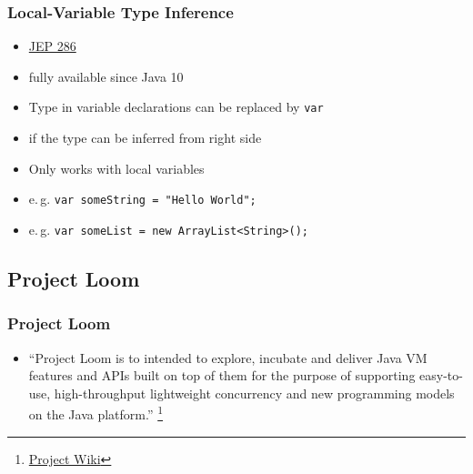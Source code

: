 \documentclass{beamer}
\begin{document}
\begin{frame}
\frametitle{Local-Variable Type Inference}
\begin{itemize}
  \item \href{https://openjdk.org/jeps/286}{JEP 286}
  \item fully available since Java 10
  \pause
  \item Type in variable declarations can be replaced by \texttt{var}
  \item if the type can be inferred from right side
  \item Only works with local variables
  \pause
  \item e.\,g. \texttt{var someString = "Hello World";}
  \item e.\,g. \texttt{var someList = new ArrayList<String>();}
\end{itemize}
\end{frame}

\subsection{Project Loom}
\begin{frame}
\frametitle{Project Loom}
\begin{itemize}
  \item ``Project Loom is to intended to explore, incubate and deliver Java VM features and APIs built on top of them for the purpose of supporting easy-to-use, high-throughput lightweight concurrency and new programming models on the Java platform.''
  \footnote{\href{https://wiki.openjdk.org/display/loom/Main}{Project Wiki}}
\end{itemize}
\end{frame}
\end{document}
